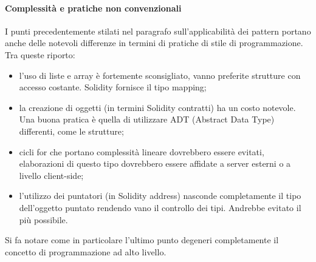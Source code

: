 \paragraph{Complessità e pratiche non convenzionali}
I punti precedentemente stilati nel paragrafo sull’applicabilità dei pattern portano anche delle notevoli differenze in termini di pratiche di stile di programmazione. Tra queste riporto:
\begin{itemize}
    \item l’uso di liste e array è fortemente sconsigliato, vanno preferite strutture con accesso costante. Solidity fornisce il tipo mapping;
    \item la creazione di oggetti (in termini Solidity contratti) ha un costo notevole. Una buona pratica è quella di utilizzare ADT (Abstract Data Type) differenti, come le strutture;
    \item cicli for che portano complessità lineare dovrebbero essere evitati, elaborazioni di questo tipo dovrebbero essere affidate a server esterni o a livello client-side;
    \item l’utilizzo dei puntatori (in Solidity address) nasconde completamente il tipo dell’oggetto puntato rendendo vano il controllo dei tipi. Andrebbe evitato il più possibile.
\end{itemize}
Si fa notare come in particolare l’ultimo punto degeneri completamente il concetto di programmazione ad alto livello.

